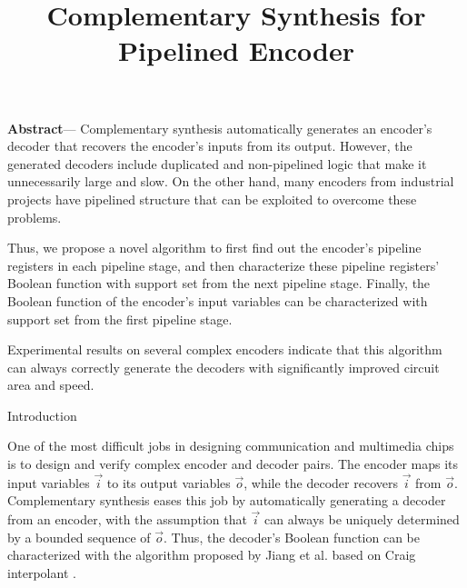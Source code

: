 \documentclass[twocolumn]{article}
\makeatletter
\def\section{\@startsection {section}{1}{\z@}{20pt plus 2pt minus 2pt}
{8pt plus 2pt minus 2pt}{\centering\normalsize\sc
\edef\@svsec{\thesection.\ }}}
\def\thesection{\Roman{section}}
\makeatother
\begin{document}
\date{}

\title{\Large\textbf{Complementary Synthesis for Pipelined Encoder}
}	%


\author{
}
\maketitle
\thispagestyle{empty}

{\small
\textbf{
Abstract}---
Complementary synthesis automatically generates an encoder's decoder
that recovers the encoder's inputs from its output.
However,
the generated decoders  
include duplicated and non-pipelined logic that make it
unnecessarily large and slow.
On the other hand,
many encoders from industrial projects have pipelined structure 
that can be exploited to overcome these problems.

Thus,
we propose a novel algorithm to first find out the encoder's pipeline registers in each pipeline stage,
and then characterize these pipeline registers' Boolean function
with support set from the next pipeline stage.
Finally,
the Boolean function of the encoder's input variables can be characterized 
with support set from the first pipeline stage.

Experimental results on several complex encoders indicate that
this algorithm can always correctly generate the decoders with significantly
improved circuit area and speed.
}

\section{Introduction}

One of the most difficult jobs in designing communication
and multimedia chips is to design and verify complex encoder and decoder pairs.
The encoder maps its input variables $\vec{i}$ to its output variables $\vec{o}$,
while the decoder recovers $\vec{i}$ from $\vec{o}$.
Complementary synthesis 
\cite{ShenICCAD09,ShenTCAD10,ShenTCAD11,ShenTCAD12,LiuICCAD11,LiuTCAD12,TuDAC13}
eases this job by
automatically generating a decoder from an encoder,
with the assumption that $\vec{i}$ can always be
uniquely determined by a bounded sequence of $\vec{o}$.
Thus,
the decoder's Boolean function can be characterized
with the algorithm proposed by Jiang et al. \cite{InterpBoolFunction}
based on Craig interpolant \cite{Craig}.
\end{document}
